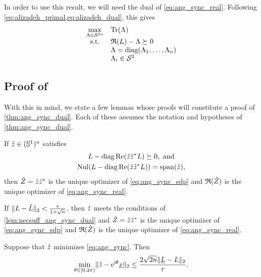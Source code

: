 In order to use this result, we will need the dual of \eqref{eq:ang_sync_real}.  Following \cref{eq:alizadeh_primal,eq:alizadeh_dual}, this gives
\begin{equation}
  \begin{array}{cl}
    \max\limits_{\Lambda \in \mathcal{S}^{2n}} & \operatorname{Tr}(\Lambda) \\
    \text{s.t.} & \mathfrak{R}(L) - \Lambda \succeq 0 \\
    & \Lambda = \operatorname{diag}(\Lambda_1, \ldots, \Lambda_n) \\
    & \Lambda_i \in \mathcal{S}^2
  \end{array} \label{eq:ang_sync_real_dual}
\end{equation}

\subsection{Proof of }
With this in mind, we state a few lemmas whose proofs will constitute a proof of \cref{thm:ang_sync_dual}.  Each of these assumes the notation and hypotheses of \cref{thm:ang_sync_dual}.

\begin{lemma}
  If $\hat{z} \in (\mathbb{S}^1)^n$ satisfies \begin{gather} L - \operatorname{diag}\operatorname{Re}(\hat{z} \hat{z}^* L) \succeq 0, \ \text{and} \label{eq:ang_sync_certificate} \\ \operatorname{Nul}(L - \operatorname{diag}\operatorname{Re}(\hat{z} \hat{z}^* L)) = \operatorname{span}(\hat{z}), \label{eq:ang_sync_nullspace} \end{gather} then $\hat{Z} = \hat{z} \hat{z}^*$ is the unique optimizer of \eqref{eq:ang_sync_sdp} and $\mathfrak{R}(\hat{Z})$ is the unique optimizer of \eqref{eq:ang_sync_real}.
  \label{lem:necsuff_ang_sync_dual}
\end{lemma}

\begin{lemma}
  If $\lVert L - \hat{L}\rVert_2 < \frac{\tau}{1 + \sqrt{n}}$, then $\hat{z}$ meets the conditions of \cref{lem:necsuff_ang_sync_dual} and $\hat{Z} = \hat{z} \hat{z}^*$ is the unique optimizer of \eqref{eq:ang_sync_sdp} and $\mathfrak{R}(\hat{Z})$ is the unique optimizer of \eqref{eq:ang_sync_real}.
  \label{lem:unique_ang_sync}
\end{lemma}

\begin{lemma} \label{lem:error_ang_sync}
  Suppose that $\hat{z}$ minimizes \eqref{eq:ang_sync}.  Then \[\min_{\theta \in [0, 2\pi)} \lVert \hat{z} - \mathrm{e}^{\mathrm{i} \theta} \underline{x} \rVert_2 \le \dfrac{2 \sqrt{2 n} \lVert\underline{L} - L\rVert_2}{\tau}.\]
\end{lemma}

